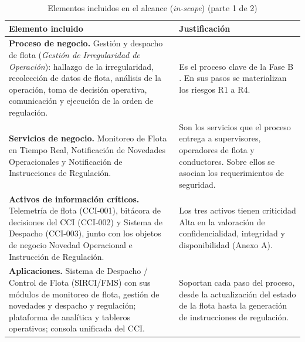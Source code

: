 \begin{table}[H]
	\caption{Elementos incluidos en el alcance (\textit{in-scope}) (parte 1 de 2)}
	\label{tab:alcance-incluido}
	\centering
	\footnotesize
	\renewcommand{\arraystretch}{1.15}
	\begin{tabularx}{\textwidth}{@{}>{\raggedright\arraybackslash}p{} Y@{}}
		\toprule
		\textbf{Elemento incluido} & \textbf{Justificación}                                                                                                                              \\
		\midrule
		\textbf{Proceso de negocio.} Gestión y despacho de flota (\textit{Gestión de Irregularidad de Operación}): hallazgo de la irregularidad, recolección de datos de flota, análisis de la operación, toma de decisión operativa, comunicación y ejecución de la orden de regulación.
		                           & Es el proceso clave de la Fase B \parencite{togaf2022}. En sus pasos se materializan los riesgos R1 a R4.
		\\
		\midrule
		\textbf{Servicios de negocio.} Monitoreo de Flota en Tiempo Real, Notificación de Novedades Operacionales y Notificación de Instrucciones de Regulación.
		                           & Son los servicios que el proceso entrega a supervisores, operadores de flota y conductores. Sobre ellos se asocian los requerimientos de seguridad.
		\\
		\midrule
		\textbf{Activos de información críticos.} Telemetría de flota (CCI-001), bitácora de decisiones del CCI (CCI-002) y Sistema de Despacho (CCI-003), junto con los objetos de negocio Novedad Operacional e Instrucción de Regulación.
		                           & Los tres activos tienen criticidad Alta en la valoración de confidencialidad, integridad y disponibilidad (Anexo A).
		\\
		\midrule
		\textbf{Aplicaciones.} Sistema de Despacho / Control de Flota (SIRCI/FMS) con sus módulos de monitoreo de flota, gestión de novedades y despacho y regulación; plataforma de analítica y tableros operativos; consola unificada del CCI.
		                           & Soportan cada paso del proceso, desde la actualización del estado de la flota hasta la generación de instrucciones de regulación.
		\\
		\bottomrule
	\end{tabularx}
\end{table}


